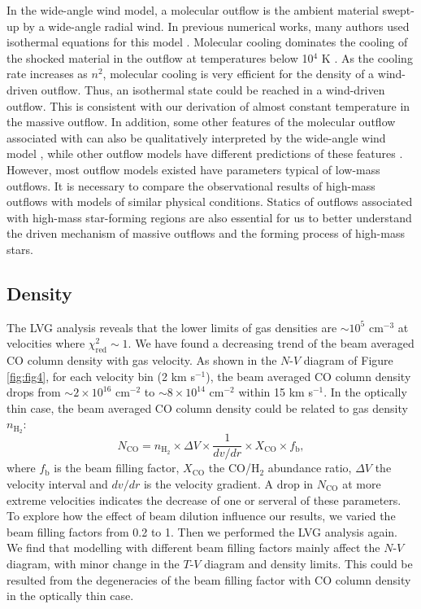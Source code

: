 In the wide-angle wind model, a molecular outflow is the ambient material swept-up by a wide-angle radial wind. In previous numerical works, many authors used isothermal equations for this model \citep{1996ApJ...472..211L,2001ApJ...557..429L}. Molecular cooling dominates the cooling of the shocked material in the outflow at temperatures below 10$^4$ K \citep{1997IAUS..182..181H}. As the cooling rate increases as $n^2$, molecular cooling is very efficient for the density of a wind-driven outflow. Thus, an isothermal state could be reached in a wind-driven outflow. This is consistent with our derivation of almost constant temperature in the massive  outflow. In addition, some other features of the molecular outflow associated with  can also be qualitatively interpreted by the wide-angle wind model \citep{2009ApJ...696...66Q}, while other outflow models have different predictions of these features \citep{2007prpl.conf..245A}. However, most outflow models existed have parameters typical of low-mass outflows. It is necessary to compare the observational results of high-mass outflows with models of similar physical conditions. Statics of outflows associated with high-mass star-forming regions are also essential for us to better understand the driven mechanism of massive outflows and the forming process of high-mass stars.

\subsection{Density}

The LVG analysis reveals that the lower limits of gas densities are $\sim 10^5$ cm$^{-3}$ at velocities where $\chi^2_{\mathrm{red}} \sim 1$. We have found a decreasing trend of the beam averaged CO column density with gas velocity. As shown in the $N$-$V$ diagram of Figure \ref{fig:fig4}, for each velocity bin (2 km s$^{-1}$), the beam averaged CO column density drops from $\sim 2 \times  10^{16} $ cm$^{-2}$ to $\sim 8 \times 10^{14}$ cm$^{-2}$ within 15 km s$^{-1}$. In the optically thin case, the beam averaged CO column density could be related to gas density $n_{\mathrm{H}_2}$: 
\begin{equation}
N_{\mathrm{CO}} = n_{\mathrm{H}_2} \times \Delta V \times \frac{1}{dv/dr} \times X_{\mathrm{CO}} \times f_{\mathrm{b}}, 
\end{equation}
where $f_{\mathrm{b}}$ is the beam filling factor, $X_{\mathrm{CO}}$ the CO/H$_2$ abundance ratio, $\Delta V$ the velocity interval and $dv/dr$ is the velocity gradient. A drop in $N_{\mathrm{CO}}$ at more extreme velocities indicates the decrease of one or serveral of these parameters. 
To explore how the effect of beam dilution influence our results, we varied the beam filling factors from 0.2 to 1. Then we performed the LVG analysis again. We find that modelling with different beam filling factors mainly affect the $N$-$V$ diagram, with minor change in the $T$-$V$ diagram and density limits. This could be resulted from the degeneracies of the beam filling factor with CO column density in the optically thin case. 

